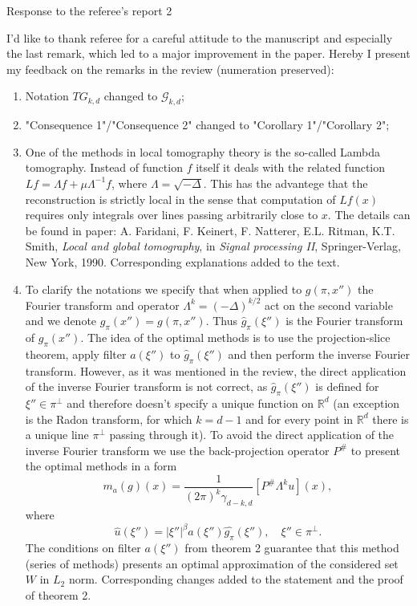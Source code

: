 \documentclass{article}
\begin{document}
\begin{center}
{\Large Response to the referee's report 2}
\end{center}
\vspace{5mm}

I'd like to thank referee for a careful attitude to the manuscript and especially the last remark, which led to a major improvement in the paper. Hereby I present my feedback on the remarks in the review (numeration preserved):

\begin{enumerate}
\item Notation $TG_{k,d}$ changed to $\mathcal G_{k,d}$;
\item "Consequence 1"/"Consequence 2" changed to "Corollary 1"/"Corollary 2";
\item One of the methods in local tomography theory is the so-called Lambda tomography. Instead of function $f$ itself it deals with the related function $Lf = \Lambda f+\mu\Lambda^{-1}f$, where $\Lambda = \sqrt{-\Delta}$. This has the advantege that the reconstruction is strictly local in the sense that computation of $Lf(x)$ requires only integrals over lines passing arbitrarily close to $x$. The details can be found in paper:
A. Faridani, F. Keinert, F. Natterer, E.L. Ritman, K.T. Smith, \textit{Local and global tomography}, in \textit{Signal processing II}, Springer-Verlag, New York, 1990.
Corresponding explanations added to the text.

\item To clarify the notations we specify that when applied to $g(\pi,x'')$ the Fourier transform and operator $\Lambda^k=(-\Delta)^{k/2}$ act on the second variable and we denote $g_\pi(x'')=g(\pi,x'')$. Thus $\widehat g_\pi(\xi'')$ is the Fourier transform of $g_\pi(x'')$. The idea of the optimal methods is to use the projection-slice theorem, apply filter $a(\xi'')$ to $\widehat g_\pi(\xi'')$ and then perform the inverse Fourier transform. However, as it was mentioned in the review, the direct application of the inverse Fourier transform is not correct, as $\widehat g_\pi(\xi'')$ is defined for $\xi''\in\pi^\perp$ and therefore doesn't specify a unique function on $\mathbb R^d$ (an exception is the Radon transform, for which $k=d-1$ and for every point in $\mathbb R^d$ there is a unique line $\pi^\perp$ passing through it). To avoid the direct application of the inverse Fourier transform we use the back-projection operator $P^\#$ to present the optimal methods in a form
    $$
	m_a(g)(x) = \frac{1}{(2\pi)^k\gamma_{d-k,d}}[P^\#\Lambda^ku](x),
	$$
where	
	$$\widehat{u}(\xi'')=|\xi''|^\beta a(\xi'')\widehat{g_\pi }(\xi''),\quad \xi''\in\pi^\perp.$$
The conditions on filter $a(\xi'')$ from theorem 2 guarantee that this method (series of methods) presents an optimal approximation of the considered set $W$ in $L_2$ norm.	Corresponding changes added to the statement and the proof of theorem 2. 
\end{enumerate}
\end{document}
